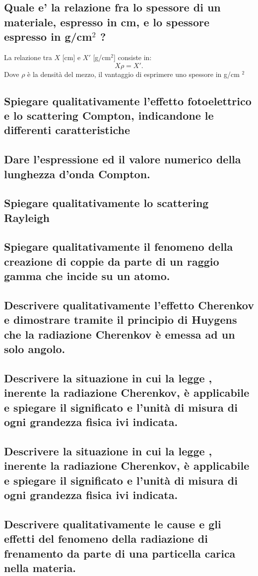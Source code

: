 \subsection[]{Quale e' la relazione fra lo spessore di un materiale, espresso in cm, e lo spessore espresso in g/cm$^2$ ?
}
La relazione tra $X$ [cm] e $X'$ [g/cm$^2$] consiste in:
\[
	X\rho = X'
.\] 
Dove $\rho$ è la densità del mezzo, il vantaggio di esprimere uno spessore in g/cm $^2$
\subsection[]{Spiegare qualitativamente l’effetto fotoelettrico e lo scattering Compton, indicandone le differenti caratteristiche
}
\subsection[]{Dare l'espressione ed il valore numerico della lunghezza d'onda Compton.
}
\subsection[]{Spiegare qualitativamente lo scattering Rayleigh
}
\subsection[]{Spiegare qualitativamente il fenomeno della creazione di coppie  da parte di un raggio gamma che incide su un atomo.
}
\subsection[]{Descrivere qualitativamente l’effetto Cherenkov e dimostrare tramite il principio di Huygens che la radiazione Cherenkov è emessa ad un solo angolo.
}
\subsection[]{Descrivere la situazione in cui la legge 
	, inerente la radiazione Cherenkov, è applicabile e spiegare il significato e l'unità di misura di ogni grandezza fisica ivi indicata.
}
\subsection[]{Descrivere la situazione in cui la legge 
	, inerente la radiazione Cherenkov, è applicabile e spiegare il significato e l'unità di misura di ogni grandezza fisica ivi indicata.
}
\subsection[]{Descrivere qualitativamente le cause e gli effetti del fenomeno della radiazione di frenamento da parte di una particella carica nella materia.
}
